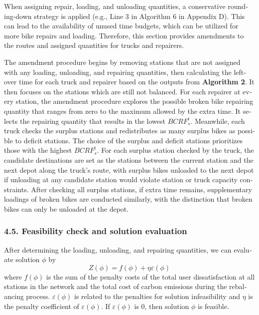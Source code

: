 \documentclass[
  english,
]{article}
\begin{document}
\begin{otherlanguage}{english}
\protect{}\label{p0525}
When assigning repair, loading, and unloading quantities, a conservative rounding-down strategy is
applied (e.g., Line 3 in Algorithm 6 in Appendix D). This can lead to the availability of unused
time budgets, which can be utilized for more bike repairs and loading. Therefore, this section
provides amendments to the routes and assigned quantities for trucks and repairers.

\protect{}\label{p0530}
The amendment procedure begins by removing stations that are not assigned with any loading,
unloading, and repairing quantities, then calculating the leftover time for each truck and repairer
based on the outputs from \textbf{Algorithm 2}. It then focuses on the stations which are still not
balanced. For each repairer at every station, the amendment procedure explores the possible broken
bike repairing quantity that ranges from zero to the maximum allowed by the extra time. It selects
the repairing quantity that results in the lowest \(\mathit{BCR}F_{s}^{\text{r}}\). Meanwhile, each
truck checks the surplus stations and redistributes as many surplus bikes as possible to deficit
stations. The choice of the surplus and deficit stations prioritizes those with the highest
\(\mathit{BCR}F_{s}^{\text{t}}\). For each surplus station checked by the truck, the candidate
destinations are set as the stations between the current station and the next depot along the
truck's route, with surplus bikes unloaded to the next depot if unloading at any candidate station
would violate station or truck capacity constraints. After checking all surplus stations, if extra
time remains, supplementary loadings of broken bikes are conducted similarly, with the distinction
that broken bikes can only be unloaded at the depot.

\protect{}\label{s0090}
\subsubsection{4.5. Feasibility check and solution evaluation}\label{st110}

\protect{}\label{p0535}
After determining the loading, unloading, and repairing quantities, we can evaluate solution
\(\phi\) by\[\tag{70}Z(\phi) = f(\phi) + \eta\varepsilon(\phi)\]where \(f(\phi)\) is the sum of the
penalty costs of the total user dissatisfaction at all stations in the network and the total cost of
carbon emissions during the rebalancing process. \(\varepsilon(\phi)\) is related to the penalties
for solution infeasibility and \(\eta\) is the penalty coefficient of \(\varepsilon(\phi)\). If
\(\varepsilon(\phi)\) is 0, then solution \(\phi\) is feasible.


\end{otherlanguage}
\end{document}
